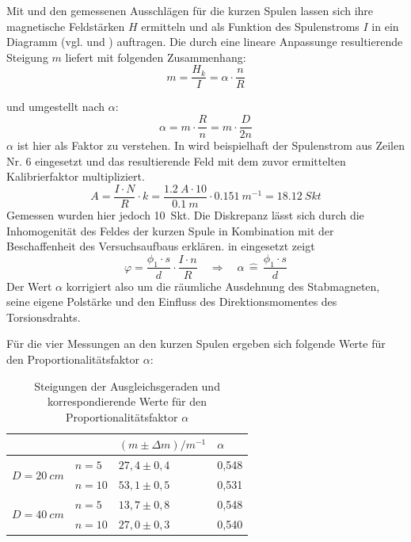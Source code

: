 Mit  und den gemessenen Ausschlägen für die kurzen Spulen lassen sich ihre magnetische Feldstärken $ H $ ermitteln
und als Funktion des Spulenstroms $ I $ in ein Diagramm (vgl.  und ) auftragen. Die
durch eine lineare Anpassunge resultierende Steigung $ m $ liefert mit  folgenden Zusammenhang:
\begin{equation}
    m = \frac{H_k}{I} = \alpha \cdot \frac{n}{R}
\end{equation}

und umgestellt nach $ \alpha $:
\begin{equation}
    \alpha = m \cdot \frac{R}{n} = m \cdot \frac{D}{2n}
\end{equation}
$\alpha$ ist hier als Faktor zu verstehen. In  wird beispielhaft der Spulenstrom aus  Zeilen Nr. 6
eingesetzt und das resultierende Feld mit dem zuvor ermittelten Kalibrierfaktor multipliziert.
\begin{equation}
    A = \frac{I \cdot N}{R} \cdot k
    = \frac{\SI{1,2}{A} \cdot 10}{\SI{0,1}{m}} \cdot \SI{0,151}{m^{-1}}
    = \SI{18,12}{Skt}
    \label{eq:test}
\end{equation}
Gemessen wurden hier jedoch \SI{10}{Skt}. Die Diskrepanz lässt sich durch die Inhomogenität des Feldes der kurzen Spule
in Kombination mit der Beschaffenheit des Versuchsaufbaus erklären.  in  eingesetzt zeigt
\begin{equation}
    \varphi = \frac{\phi_1 \cdot s}{d} \cdot \frac{I \cdot n}{R} \quad \Rightarrow \quad \alpha \, \widehat{=} \, \frac{\phi_1 \cdot s}{d}
\end{equation}
Der Wert $\alpha$ korrigiert also um die räumliche Ausdehnung des Stabmagneten, seine eigene Polstärke und den Einfluss
des Direktionsmomentes des Torsionsdrahts.
\par\medskip
Für die vier Messungen an den kurzen Spulen ergeben sich folgende Werte für den Proportionalitätsfaktor $\alpha$:
\vspace{5mm}
\begin{table}[h]
    \centering
    \caption[Proportionalitätsfaktoren]{Steigungen der Ausgleichsgeraden und korrespondierende Werte für den Proportionalitätsfaktor $\alpha$}
    \begin{tabular}{@{}llll@{}}
        \toprule
        \multicolumn{2}{l}{}                       & $(m \pm \Delta m) / m^{-1}$  & $\alpha$ \\ \midrule
        \multirow{2}{*}{$D=\SI{20}{cm}$} & $n=5$   & $27,4 \pm 0,4$               & 0,548    \\
                                         & $n=10$  & $53,1 \pm 0,5$               & 0,531    \\
        \multirow{2}{*}{$D=\SI{40}{cm}$} & $n=5$   & $13,7 \pm 0,8$               & 0,548    \\
                                         & $n=10$  & $27,0 \pm 0,3$               & 0,540    \\ \cmidrule(l){1-4} 
    \end{tabular}
\end{table}

